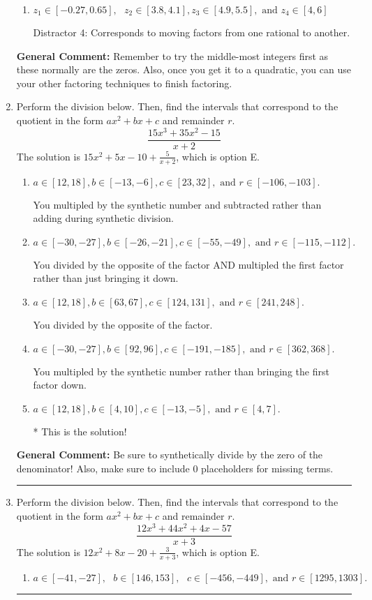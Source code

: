 \documentclass{extbook}[14pt]
\newcommand{\litem}[1]{\item #1

\rule{\textwidth}{0.4pt}}
\begin{document}
\begin{enumerate}
{\begin{enumerate}[label=\Alph*.]
* This is the solution!
\item \( z_1 \in [-0.27, 0.65], \text{   }  z_2 \in [3.8, 4.1], z_3 \in [4.9, 5.5], \text{   and   } z_4 \in [4, 6] \)

 Distractor 4: Corresponds to moving factors from one rational to another.
\end{enumerate}

\textbf{General Comment:} Remember to try the middle-most integers first as these normally are the zeros. Also, once you get it to a quadratic, you can use your other factoring techniques to finish factoring.
}
\litem{
Perform the division below. Then, find the intervals that correspond to the quotient in the form $ax^2+bx+c$ and remainder $r$.
\[ \frac{15x^{3} +35 x^{2} -15}{x + 2} \]The solution is \( 15x^{2} +5 x -10 + \frac{5}{x + 2} \), which is option E.\begin{enumerate}[label=\Alph*.]
\item \( a \in [12, 18], b \in [-13, -6], c \in [23, 32], \text{ and } r \in [-106, -103]. \)

 You multipled by the synthetic number and subtracted rather than adding during synthetic division.
\item \( a \in [-30, -27], b \in [-26, -21], c \in [-55, -49], \text{ and } r \in [-115, -112]. \)

 You divided by the opposite of the factor AND multipled the first factor rather than just bringing it down.
\item \( a \in [12, 18], b \in [63, 67], c \in [124, 131], \text{ and } r \in [241, 248]. \)

 You divided by the opposite of the factor.
\item \( a \in [-30, -27], b \in [92, 96], c \in [-191, -185], \text{ and } r \in [362, 368]. \)

 You multipled by the synthetic number rather than bringing the first factor down.
\item \( a \in [12, 18], b \in [4, 10], c \in [-13, -5], \text{ and } r \in [4, 7]. \)

* This is the solution!
\end{enumerate}

\textbf{General Comment:} Be sure to synthetically divide by the zero of the denominator! Also, make sure to include 0 placeholders for missing terms.
}
\litem{
Perform the division below. Then, find the intervals that correspond to the quotient in the form $ax^2+bx+c$ and remainder $r$.
\[ \frac{12x^{3} +44 x^{2} +4 x -57}{x + 3} \]The solution is \( 12x^{2} +8 x -20 + \frac{3}{x + 3} \), which is option E.\begin{enumerate}[label=\Alph*.]
\item \( a \in [-41, -27], \text{   } b \in [146, 153], \text{   } c \in [-456, -449], \text{   and   } r \in [1295, 1303]. \)


\end{enumerate}}
\end{enumerate}
\end{document}
